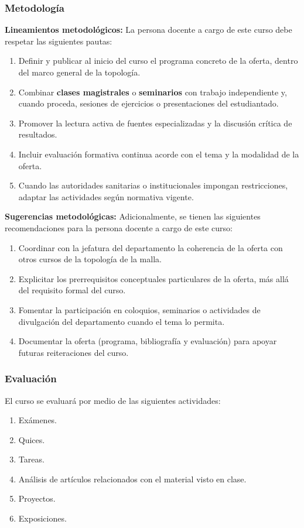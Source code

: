 \begin{refsection}
\subsubsection*{Metodología}

\noindent \textbf{Lineamientos metodológicos:} La persona docente a cargo de este curso debe respetar las siguientes pautas:

\begin{enumerate}
    \item Definir y publicar al inicio del curso el programa concreto de la oferta, dentro del marco general de la topología.
    \item Combinar \textbf{clases magistrales} o \textbf{seminarios} con trabajo independiente y, cuando proceda, sesiones de ejercicios o presentaciones del estudiantado.
    \item Promover la lectura activa de fuentes especializadas y la discusión crítica de resultados.
    \item Incluir evaluación formativa continua acorde con el tema y la modalidad de la oferta.
    \item Cuando las autoridades sanitarias o institucionales impongan restricciones, adaptar las actividades según normativa vigente.
\end{enumerate}

\textbf{Sugerencias metodológicas:} Adicionalmente, se tienen las siguientes recomendaciones para la persona docente a cargo de este curso:

\begin{enumerate}
    \item Coordinar con la jefatura del departamento la coherencia de la oferta con otros cursos de la topología de la malla.
    \item Explicitar los prerrequisitos conceptuales particulares de la oferta, más allá del requisito formal del curso.
    \item Fomentar la participación en coloquios, seminarios o actividades de divulgación del departamento cuando el tema lo permita.
    \item Documentar la oferta (programa, bibliografía y evaluación) para apoyar futuras reiteraciones del curso.
\end{enumerate}

\subsubsection*{Evaluación}

El curso se evaluará por medio de las siguientes actividades:

\begin{enumerate}
\item Exámenes.
\item Quices.
\item Tareas.
\item Análisis de artículos relacionados con el material visto en clase.
\item Proyectos.
\item Exposiciones.
\end{enumerate}

\end{refsection}
